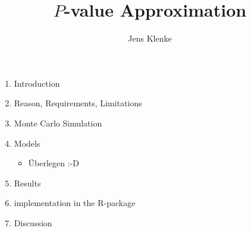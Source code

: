 \documentclass[a4paper, 12pt]{article}
\title{$P$-value Approximation}
\author{Jens Klenke}
\date{}
\begin{document}
 

\maketitle
\begin{enumerate}
	\item Introduction
	\item Reason, Requirements, Limitations
	\item Monte Carlo Simulation
	\item Models 
	\begin{itemize}
		\item Überlegen :-D
	\end{itemize}
	\item Results 
	\item implementation in the R-package
	\item Discussion
\end{enumerate}

\end{document}
